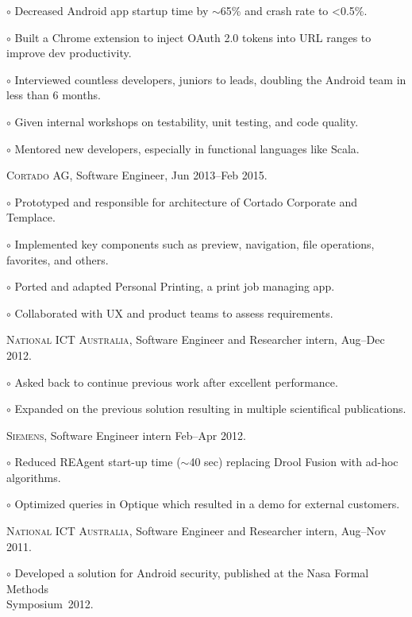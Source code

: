 \documentclass[letterpaper]{article}
\renewenvironment{itemize}{
  \begin{list}{}{
    \setlength{\leftmargin}{1.5em}
  }
}{
  \end{list}
}
\newenvironment{no-indent-itemize}{
  \begin{list}{}{
    \setlength{\leftmargin}{0em}
  }
}{
  \end{list}
}
\def\tilde{$\scriptstyle\sim$}
\def\bullet{$\circ$\xspace}
\begin{document}
\begin{no-indent-itemize}
\begin{itemize}
    \item\bullet Decreased Android app startup time by \tilde 65\% and crash rate to <0.5\%.
    \item\bullet Built a Chrome extension to inject OAuth 2.0 tokens into URL ranges to improve dev productivity.
    \item\bullet Interviewed countless developers, juniors to leads, doubling the Android team in less than 6 months.
    \item\bullet Given internal workshops on testability, unit testing, and code quality.
    \item\bullet Mentored new developers, especially in functional languages like Scala.
  \end{itemize}
  \item \textsc{Cortado AG}, Software Engineer, Jun 2013--Feb 2015.
  \begin{itemize}
    \item\bullet Prototyped and responsible for architecture of Cortado Corporate and Templace.
    \item\bullet Implemented key components such as preview, navigation, file operations, favorites, and others.
    \item\bullet Ported and adapted Personal Printing, a print job managing app.
    \item\bullet Collaborated with UX and product teams to assess requirements.
  \end{itemize}
  \item \textsc{National ICT Australia}, Software Engineer and Researcher intern, Aug--Dec 2012. 
  \begin{itemize}
    \item\bullet Asked back to continue previous work after excellent performance.
    \item\bullet Expanded on the previous solution resulting in multiple scientifical publications.
  \end{itemize}
  \item \textsc{Siemens}, Software Engineer intern Feb--Apr 2012.
  \begin{itemize}
    \item\bullet Reduced REAgent start-up time (\tilde 40 sec) replacing Drool Fusion with 
          ad-hoc algorithms.
    \item\bullet Optimized queries in Optique which resulted in a demo for external customers.
  \end{itemize}
  \item \textsc{National ICT Australia}, Software Engineer and Researcher intern, Aug--Nov 2011. 
  \begin{itemize}
    \item\bullet Developed a solution for Android security, published at the Nasa Formal Methods \\
    \phantom{\bullet }Symposium~2012.
  \end{itemize}
\end{no-indent-itemize}
\end{document}
